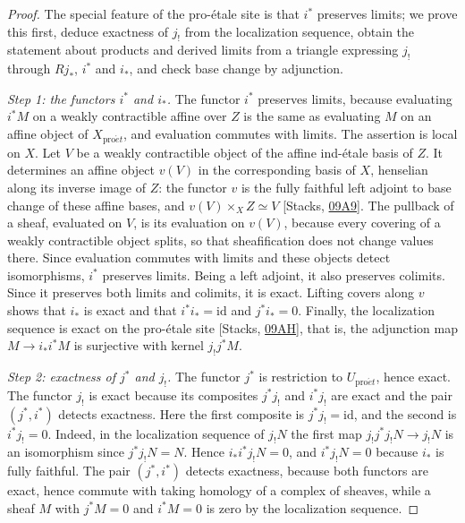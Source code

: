 \documentclass[11pt]{article}
\begin{document}
\begin{proof}[{Proof}]\label{bp182}%
The special feature of the pro-étale site is that \(i^*\) preserves limits; we prove this first, deduce exactness of \(j_!\) from the localization sequence, obtain the statement about products and derived limits from a triangle expressing \(j_!\) through \(Rj_*\), \(i^*\) and \(i_*\), and check base change by adjunction.

\emph{Step 1: the functors \(i^*\) and \(i_*\).} The functor \(i^*\) preserves limits, because evaluating \(i^*M\) on a weakly contractible affine over \(Z\) is the same as evaluating \(M\) on an affine object of \(X_{\mathrm{pro}\acute{e}t}\), and evaluation commutes with limits. The assertion is local on \(X\). Let \(V\) be a weakly contractible object of the affine ind-étale basis of \(Z\). It determines an affine object \(v(V)\) in the corresponding basis of \(X\), henselian along its inverse image of \(Z\): the functor \(v\) is the fully faithful left adjoint to base change of these affine bases, and \(v(V)\times_XZ\simeq V\) [Stacks, \href{https://stacks.math.columbia.edu/tag/09A9}{09A9}]. The pullback of a sheaf, evaluated on \(V\), is its evaluation on \(v(V)\), because every covering of a weakly contractible object splits, so that sheafification does not change values there. Since evaluation commutes with limits and these objects detect isomorphisms, \(i^*\) preserves limits. Being a left adjoint, it also preserves colimits. Since it preserves both limits and colimits, it is exact. Lifting covers along \(v\) shows that \(i_*\) is exact and that \(i^*i_*=\mathrm{id}\) and \(j^*i_*=0\). Finally, the localization sequence is exact on the pro-étale site [Stacks, \href{https://stacks.math.columbia.edu/tag/09AH}{09AH}], that is, the adjunction map \(M\to i_*i^*M\) is surjective with kernel \(j_!j^*M\).

\emph{Step 2: exactness of \(j^*\) and \(j_!\).} The functor \(j^*\) is restriction to \(U_{\mathrm{pro}\acute{e}t}\), hence exact. The functor \(j_!\) is exact because its composites \(j^*j_!\) and \(i^*j_!\) are exact and the pair \((j^*,i^*)\) detects exactness. Here the first composite is \(j^*j_!=\mathrm{id}\), and the second is \(i^*j_!=0\). Indeed, in the localization sequence of \(j_!N\) the first map \(j_!j^*j_!N\to j_!N\) is an isomorphism since \(j^*j_!N=N\). Hence \(i_*i^*j_!N=0\), and \(i^*j_!N=0\) because \(i_*\) is fully faithful. The pair \((j^*,i^*)\) detects exactness, because both functors are exact, hence commute with taking homology of a complex of sheaves, while a sheaf \(M\) with \(j^*M=0\) and \(i^*M=0\) is zero by the localization sequence.


\end{proof}
\end{document}
